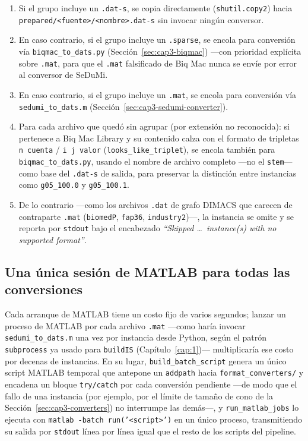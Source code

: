 \begin{enumerate}
    \item Si el grupo incluye un \texttt{.dat-s}, se copia directamente
    (\texttt{shutil.copy2}) hacia \texttt{prepared/<fuente>/<nombre>.dat-s}
    sin invocar ning\'un conversor.
    \item En caso contrario, si el grupo incluye un \texttt{.sparse}, se
    encola para conversi\'on v\'ia \texttt{biqmac\_to\_dats.py}
    (Secci\'on~\ref{sec:cap3-biqmac}) —con prioridad expl\'icita sobre
    \texttt{.mat}, para que el \texttt{.mat} falsificado de Biq Mac nunca
    se env\'ie por error al conversor de SeDuMi.
    \item En caso contrario, si el grupo incluye un \texttt{.mat}, se
    encola para conversi\'on v\'ia \texttt{sedumi\_to\_dats.m}
    (Secci\'on~\ref{sec:cap3-sedumi-converter}).
    \item Para cada archivo que qued\'o sin agrupar (por extensi\'on no
    reconocida): si pertenece a Biq Mac Library y su contenido calza con
    el formato de tripletas \texttt{n cuenta} / \texttt{i j valor}
    (\texttt{looks\_like\_triplet}), se encola tambi\'en para
    \texttt{biqmac\_to\_dats.py}, usando el nombre de archivo completo
    —no el \texttt{stem}— como base del \texttt{.dat-s} de salida, para
    preservar la distinci\'on entre instancias como \texttt{g05\_100.0} y
    \texttt{g05\_100.1}.
    \item De lo contrario —como los archivos \texttt{.dat} de grafo DIMACS
    que carecen de contraparte \texttt{.mat} (\texttt{biomedP},
    \texttt{fap36}, \texttt{industry2})—, la instancia se omite y se
    reporta por \texttt{stdout} bajo el encabezado \emph{``Skipped \ldots\
    instance(s) with no supported format''}.
\end{enumerate}

\subsection{Una \'unica sesi\'on de MATLAB para todas las conversiones}

Cada arranque de MATLAB tiene un costo fijo de varios segundos; lanzar un
proceso de MATLAB por cada archivo \texttt{.mat} —como har\'ia invocar
\texttt{sedumi\_to\_dats.m} una vez por instancia desde Python, seg\'un el
patr\'on \texttt{subprocess} ya usado para \texttt{buildIS}
(Cap\'itulo~\ref{cap:1})— multiplicar\'ia ese costo por decenas de
instancias. En su lugar, \texttt{build\_batch\_script} genera un \'unico
script MATLAB temporal que antepone un \texttt{addpath} hacia
\texttt{format\_converters/} y encadena un bloque \texttt{try/catch} por
cada conversi\'on pendiente —de modo que el fallo de una instancia (por
ejemplo, por el l\'imite de tama\~no de cono de la
Secci\'on~\ref{sec:cap3-converters}) no interrumpe las dem\'as—, y
\texttt{run\_matlab\_jobs} lo ejecuta con \texttt{matlab -batch
run('<script>')} en un \'unico proceso, transmitiendo su salida por
\texttt{stdout} l\'inea por l\'inea igual que el resto de los scripts del
pipeline.


